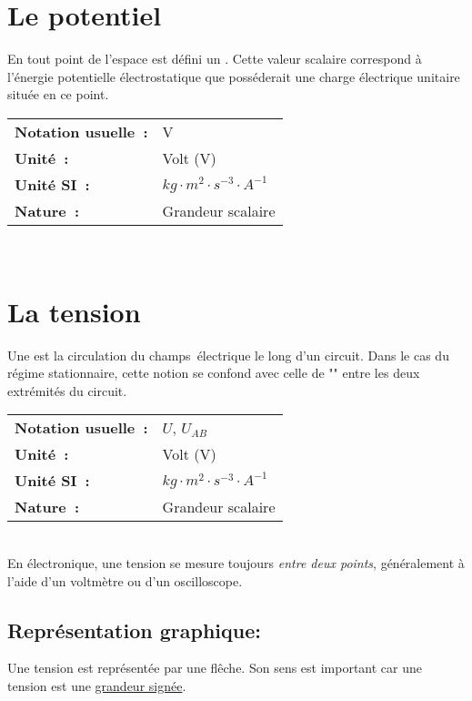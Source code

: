 \section{Le potentiel}

En tout point de l'espace est défini un . Cette valeur scalaire correspond à l'énergie potentielle électrostatique que posséderait une charge électrique unitaire située en ce point. \\

\begin{tabular}{ll}
\textbf{Notation usuelle~:} & V \\
	\textbf{Unité~:} & Volt (V)\\
\textbf{Unité SI~:} & ${kg} \cdot m^2 \cdot {s}^{-3} \cdot A^{-1}$ \\
\textbf{Nature~:} & Grandeur scalaire 
\end{tabular}\\

\section{La tension}

Une  est la circulation du champs électrique le long d'un circuit. Dans le cas du régime stationnaire, cette notion se confond avec celle de "" entre les deux extrémités du circuit. \\

\begin{tabular}{ll}
\textbf{Notation usuelle~:} & $U$, $U_{AB}$ \\
	\textbf{Unité~:} & Volt (V) \\
\textbf{Unité SI~:} & ${kg} \cdot m^2 \cdot {s}^{-3} \cdot A^{-1}$ \\
\textbf{Nature~:} & Grandeur scalaire \\
\end{tabular} \\

En électronique, une tension se mesure toujours \emph{entre deux points}, généralement à l'aide d'un voltmètre ou d'un oscilloscope. 

\subsection*{Représentation graphique: }

\begin{minipage}{7cm}
	 
\end{minipage}
\hspace{1cm}
\begin{minipage}{7cm}
	Une tension est représentée par une flêche. Son sens est important car une tension est une \underline{grandeur signée}. 
\end{minipage}\\

